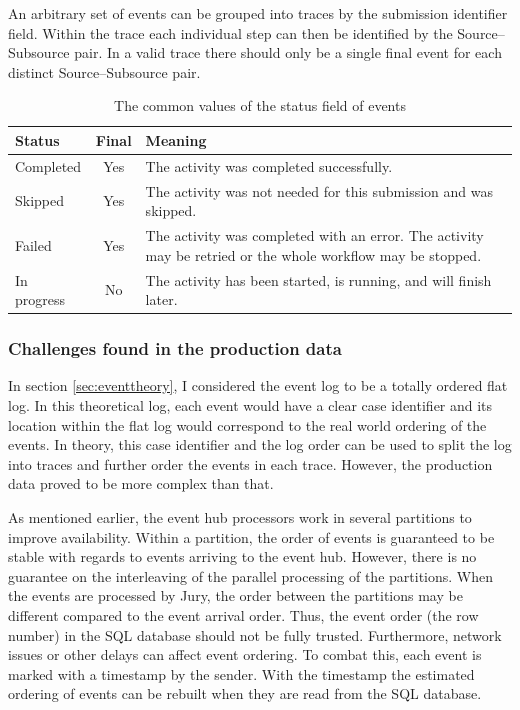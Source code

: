An arbitrary set of events can be grouped into traces by the submission identifier field. 
Within the trace each individual step can then be identified by the Source--Subsource pair.
In a valid trace there should only be a single final event for each distinct Source--Subsource pair.

\begin{table}[htb]
\begin{center}
\begin{tabularx}{\linewidth}{| l | c | X | }
\hline
\textbf{Status} & \textbf{Final} & \textbf{Meaning} \\
\hline
Completed   & Yes & The activity was completed successfully. \\
\hline
Skipped     & Yes & The activity was not needed for this submission and was skipped. \\
\hline
Failed      & Yes & The activity was completed with an error. The activity may be retried or the whole workflow may be stopped. \\
\hline
In progress & No  & The activity has been started, is running, and will finish later. \\
\hline
\end{tabularx}
\end{center}
\caption{The common values of the status field of events}
\label{tab:statuses}
\end{table}

\subsubsection{Challenges found in the production data}
\label{sec:datachallenges}

In section \ref{sec:eventtheory}, I considered the event log to be a totally ordered flat log. 
In this theoretical log, each event would have a clear case identifier and its location within the flat log would correspond to the real world ordering of the events.
In theory, this case identifier and the log order can be used to split the log into traces and further order the events in each trace.
However, the production data proved to be more complex than that. 

As mentioned earlier, the event hub processors work in several partitions to improve availability.
Within a partition, the order of events is guaranteed to be stable with regards to events arriving to the event hub. 
However, there is no guarantee on the interleaving of the parallel processing of the partitions.
When the events are processed by Jury, the order between the partitions may be different compared to the event arrival order. 
Thus, the event order (the row number) in the SQL database should not be fully trusted.
Furthermore, network issues or other delays can affect event ordering. 
To combat this, each event is marked with a timestamp by the sender. 
With the timestamp the estimated ordering of events can be rebuilt when they are read from the SQL database.

